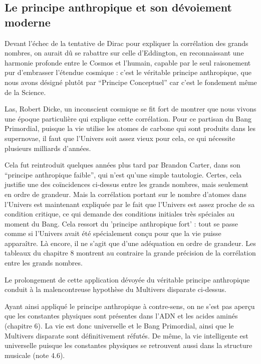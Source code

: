 \documentclass[a4paper,12pt]{article}
\begin{document}
\subsection{Le principe anthropique et son dévoiement moderne}
 
Devant l'échec de la tentative de Dirac pour expliquer la corrélation des grands nombres, on aurait dû se rabattre sur celle d'Eddington, en reconnaissant une harmonie profonde entre le Cosmos et l'humain, capable par le seul raisonement pur d'embrasser l'étendue cosmique : c'est le véritable principe anthropique, que nous avons désigné plutôt par ``Principe Conceptuel'' car c'est le fondement m\^eme de la Science. 


Las, Robert Dicke, un inconscient cosmique  se fit fort de montrer que nous vivons une époque particulière qui explique cette corrélation. Pour ce partisan du Bang Primordial, puisque la vie utilise les atomes de carbone qui sont produits dans les supernovae, il faut que l'Univers soit assez vieux pour cela, ce qui nécessite plusieurs milliards d'années.

Cela fut reintroduit quelques années plus tard par Brandon Carter, dans son ``principe anthropique faible'', qui n'est qu'une simple tautologie. Certes, cela justifie une des coïncidences ci-dessus entre les grands nombres, mais seulement en ordre de grandeur. Mais la corrélation portant sur le nombre d'atomes dans l'Univers est maintenant expliquée par le fait que l'Univers est assez proche de sa condition critique, ce qui demande des conditions initiales très spéciales au moment du Bang. Cela ressort du 'principe anthropique fort' : tout se passe comme si l'Univers avait été spécialement conçu pour que la vie puisse apparaître. Là encore, il ne s'agit que d'une adéquation en ordre de grandeur. Les tableaux du chapitre 8 montrent au contraire la grande précision de la corrélation entre les grands nombres.

Le prolongement de cette application dévoyée du véritable principe anthropique conduit à la malencontreuse hypothèse du Multivers disparate ci-dessus.
 
Ayant ainsi appliqué le principe anthropique à contre-sens, on ne s'est pas aperçu que les constantes physiques sont présentes dans l'ADN et les acides aminés (chapitre 6).  La vie est donc universelle et le Bang Primordial, ainsi que le Multivers disparate sont définitivement réfutés. De même, la vie intelligente est universelle puisque les constantes physiques se retrouvent aussi dans la structure musicale (note 4.6).
\end{document}
